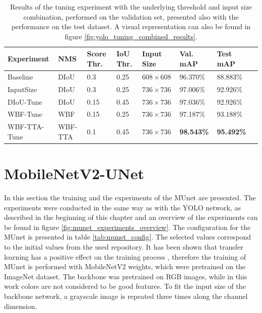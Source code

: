 \begin{table}
\footnotesize
\begin{center}
\begin{tabular}{|l|l|l|l|l|l|l|l|}

\hline
\textbf{Experiment} & \textbf{NMS} & \textbf{Score Thr.} & \textbf{IoU Thr.} & \textbf{Input Size} & \textbf{Val. mAP} & \textbf{Test mAP}\\
\hline
Baseline & DIoU    & 0.3  & 0.25 & $608 \times 608$ & 96.370\% & 88.883\% \\
\hline
InputSize        & DIoU    & 0.3  & 0.25 & $736 \times 736$ & 97.006\% & 92.926\% \\
\hline
DIoU-Tune        & DIoU    & 0.15 & 0.45 & $736 \times 736$ & 97.036\% & 92.926\% \\
\hline
WBF-Tune        & WBF     & 0.15 & 0.25 & $736 \times 736$ & 97.187\% & 93.188\% \\
\hline
WBF-TTA-Tune     & WBF-TTA & 0.1  & 0.45 & $736 \times 736$ & \textbf{98.543\%} & \textbf{95.492\%} \\
\hline
\end{tabular}
\caption{Results of the tuning experiment with the underlying threshold and input size combination, performed on the validation set, presented also with the performance on the test dataset. A visual representation can also be found in figure \ref{fig:yolo_tuning_combined_results}.}
\label{tab:yolo_tuning_combined_results}
\end{center}
\end{table}





\section{MobileNetV2-UNet}
\label{sec:training_munet}

In this section the training and the experiments of the \ac{MUnet} are presented.
The experiments were conducted in the same way as with the YOLO network, as described in the beginning of this chapter and an overview of the experiments can be found in figure \ref{fig:munet_experiments_overview}.
The configuration for the \ac{MUnet} is presented in table \ref{tab:munet_config}.
The selected values correspond to the initial values from the used repository.
It has been shown that transfer learning has a positive effect on the training process \cite{mobile_unet}, therefore the training of \ac{MUnet} is performed with MobileNetV2 weights, which were pretrained on the ImageNet dataset.
The backbone was pretrained on RGB images, while in this work colors are not considered to be good features.
To fit the input size of the backbone network, a grayscale image is repeated three times along the channel dimension.

